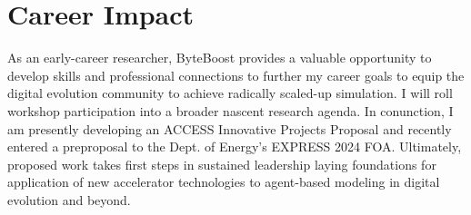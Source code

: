 \section{Career Impact}

As an early-career researcher, ByteBoost provides a valuable opportunity to develop skills and professional connections to further my career goals to equip the digital evolution community to achieve radically scaled-up simulation.
I will roll workshop participation into a broader nascent research agenda.
In conunction, I am presently developing an ACCESS Innovative Projects Proposal and recently entered a preproposal to the Dept. of Energy's EXPRESS 2024 FOA.
Ultimately, proposed work takes first steps in sustained leadership laying foundations for application of new accelerator technologies to agent-based modeling in digital evolution and beyond.



